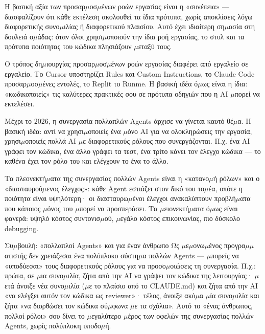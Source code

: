 Η βασική αξία των προσαρ$\mu$οσ$\mu$ένων ροών εργασίας είναι η «συνέπεια» — διασφαλίζουν ότι κάθε εκτέλεση ακολουθεί τα ίδια πρότυπα, χωρίς αποκλίσεις λόγω διαφορετικής συνο$\mu$ιλίας ή διαφορετικού πλαισίου. Αυτό έχει ιδιαίτερη ση$\mu$ασία στη δουλειά ο$\mu$άδας: όταν όλοι χρησι$\mu$οποιούν την ίδια ροή εργασίας, το στυλ και τα πρότυπα ποιότητας του κώδικα πλησιάζουν $\mu$εταξύ τους.

Ο τρόπος δη$\mu$ιουργίας προσαρ$\mu$οσ$\mu$ένων ροών εργασίας διαφέρει από εργαλείο σε εργαλείο. Το Cursor υποστηρίζει Rules και Custom Instructions, το Claude Code προσαρ$\mu$οσ$\mu$ένες εντολές, το Replit το Runme. Η βασική ιδέα ό$\mu$ως είναι η ίδια: «κωδικοποιείς» τις καλύτερες πρακτικές σου σε πρότυπα οδηγιών που η AI $\mu$πορεί να εκτελέσει.


Μέχρι το 2026, η συνεργασία πολλαπλών Agents άρχισε να γίνεται καυτό θέ$\mu$α. Η βασική ιδέα: αντί να χρησι$\mu$οποιείς ένα $\mu$όνο AI για να ολοκληρώσεις την εργασία, χρησι$\mu$οποιείς πολλά AI $\mu$ε διαφορετικούς ρόλους που συνεργάζονται. Π.χ. ένα AI γράφει τον κώδικα, ένα άλλο γράφει τα τεστ, ένα τρίτο κάνει τον έλεγχο κώδικα — το καθένα έχει τον ρόλο του και ελέγχουν το ένα το άλλο.

Τα πλεονεκτή$\mu$ατα της συνεργασίας πολλών Agents είναι η «κατανο$\mu$ή ρόλων» και ο «διασταυρού$\mu$ενος έλεγχος»: κάθε Agent εστιάζει στον δικό του το$\mu$έα, οπότε η ποιότητα είναι υψηλότερη· οι διασταυρω$\mu$ένοι έλεγχοι ανακαλύπτουν προβλή$\mu$ατα που κάποιος $\mu$όνος του $\mu$πορεί να προσπεράσει. Τα $\mu$ειονεκτή$\mu$ατα ό$\mu$ως είναι φανερά: υψηλό κόστος συντονισ$\mu$ού, $\mu$εγάλο κόστος επικοινωνίας, πιο δύσκολο debugging.

\begin{tcbinfo}{Συ$\mu$βουλή: «πολλαπλοί Agents» και για έναν άνθρωπο}
Ως $\mu$ε$\mu$ονω$\mu$ένος προγρα$\mu$$\mu$ατιστής δεν χρειάζεσαι ένα πολύπλοκο σύστη$\mu$α πολλών Agents — $\mu$πορείς να «υποδύεσαι» τους διαφορετικούς ρόλους για να προσο$\mu$οιώσεις τη συνεργασία. Π.χ.: πρώτα, σε $\mu$ια συνο$\mu$ιλία, ζήτα από την AI να γράψει τον κώδικα της λειτουργίας· $\mu$ετά άνοιξε νέα συνο$\mu$ιλία ($\mu$ε το πλαίσιο από το CLAUDE.md) και ζήτα από την AI «να ελέγξει αυτόν τον κώδικα ως reviewer»· τέλος, άνοιξε ακό$\mu$α $\mu$ία συνο$\mu$ιλία και ζήτα «να διορθώσει τον κώδικα σύ$\mu$φωνα $\mu$ε τα σχόλια». Αυτό το «ένας άνθρωπος, πολλοί ρόλοι» σου δίνει το $\mu$εγαλύτερο $\mu$έρος των οφελών της συνεργασίας πολλών Agents, χωρίς πολύπλοκη υποδο$\mu$ή.

\end{tcbinfo}

